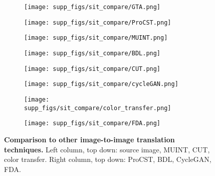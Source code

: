 \documentclass[letterpaper]{article} \usepackage[]{aaai23}  \usepackage{times}  \usepackage{helvet}  \usepackage{courier}  \usepackage[hyphens]{url}  \usepackage{graphicx} \urlstyle{rm} \def\UrlFont{\rm}  \usepackage{natbib}  \usepackage{caption} \frenchspacing  \setlength{\pdfpagewidth}{8.5in} \setlength{\pdfpageheight}{11in} \usepackage{algorithm}
\begin{document}
\begin{figure*}
    \begin{subfigure}{0.5\linewidth}
        \centering
        \texttt{[image: supp\_figs/sit\_compare/GTA.png]}
    \end{subfigure}
    \begin{subfigure}{0.5\linewidth}
        \centering
        \texttt{[image: supp\_figs/sit\_compare/ProCST.png]}
    \end{subfigure}
        \begin{subfigure}{0.5\linewidth}
        \centering
        \texttt{[image: supp\_figs/sit\_compare/MUINT.png]}
    \end{subfigure}
    \begin{subfigure}{0.5\linewidth}
        \centering
        \texttt{[image: supp\_figs/sit\_compare/BDL.png]}
    \end{subfigure}
    \begin{subfigure}{0.5\linewidth}
        \centering
        \texttt{[image: supp\_figs/sit\_compare/CUT.png]}
    \end{subfigure}
    \begin{subfigure}{0.5\linewidth}
        \centering
        \texttt{[image: supp\_figs/sit\_compare/cycleGAN.png]}
    \end{subfigure}
    \begin{subfigure}{0.5\linewidth}
        \centering
        \texttt{[image: supp\_figs/sit\_compare/color\_transfer.png]}
    \end{subfigure}
    \begin{subfigure}{0.5\linewidth}
        \centering
        \texttt{[image: supp\_figs/sit\_compare/FDA.png]}
    \end{subfigure}

    \caption{\textbf{Comparison to other image-to-image translation techniques.} Left column, top down: source image, MUINT, CUT, color transfer. Right column, top down: ProCST, BDL, CycleGAN, FDA.}
    \label{sit_compare}
\end{figure*}
\end{document}
